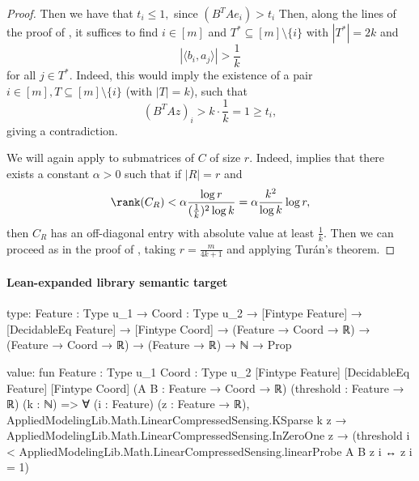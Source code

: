 \documentclass[10pt]{article}
\begin{document}
\begin{ReviewVerbatim}
\begin{proof}
    Then we have that $t_i \le 1,$ since $(B^TAe_i) > t_i$ Then, along the lines of the proof of , it suffices to find $i\in [m]$ and $T^*\subseteq [m]\setminus \{i\}$ with $|T^*|=2k$ and
    \begin{equation}
        |\langle b_i, a_j \rangle| > \frac{1}{k}
    \end{equation}
    for all $j\in T^*$. Indeed, this would imply the existence of a pair $i\in [m], T\subseteq [m]\setminus\{i\}$ (with $|T|=k$), such that
    \begin{equation}
        (B^TAz)_i > k\cdot \frac{1}{k} = 1 \ge t_i,
    \end{equation}
    giving a contradiction.

    We will again apply  to submatrices of $C$ of size $r$. Indeed,  implies that there exists a constant $\alpha > 0$ such that if $|R|=r$ and
    \begin{equation}
        \rank(C_R) < \alpha \frac{\log r}{(\frac{1}{k})^2\log k} = \alpha \frac{k^2}{\log k}\log r,
    \end{equation}
    then $C_R$ has an off-diagonal entry with absolute value at least $\frac{1}{k}.$ Then we can proceed as in the proof of , taking $r = \frac{m}{4k+1}$ and applying Tur\'an's theorem.
\end{proof}
\end{ReviewVerbatim}



\paragraph{Lean-expanded library semantic target}
\begin{ReviewVerbatim}
type:
{Feature : Type u_1} →
  {Coord : Type u_2} →
    [Fintype Feature] →
      [DecidableEq Feature] → [Fintype Coord] → (Feature → Coord → ℝ) → (Feature → Coord → ℝ) → (Feature → ℝ) → ℕ → Prop

value:
fun {Feature : Type u_1} {Coord : Type u_2} [Fintype Feature] [DecidableEq Feature] [Fintype Coord]
    (A B : Feature → Coord → ℝ) (threshold : Feature → ℝ) (k : ℕ) =>
  ∀ (i : Feature) (z : Feature → ℝ),
    AppliedModelingLib.Math.LinearCompressedSensing.KSparse k z →
      AppliedModelingLib.Math.LinearCompressedSensing.InZeroOne z →
        (threshold i < AppliedModelingLib.Math.LinearCompressedSensing.linearProbe A B z i ↔ z i = 1)
\end{ReviewVerbatim}
\end{document}
